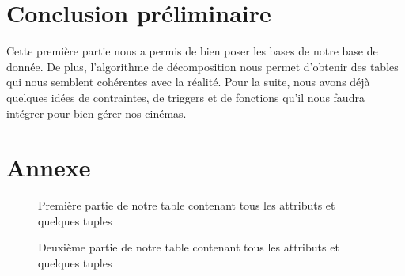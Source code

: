 \documentclass[a4paper,sffamily,12pt]{article}
\begin{document}
		\newpage

		\section{Conclusion préliminaire}

			\vspace{0.5cm}
			
			Cette première partie nous a permis de bien poser les bases de notre base de donnée. De plus, l'algorithme de décomposition nous permet d'obtenir des tables qui nous semblent cohérentes avec la réalité. Pour la suite, nous avons déjà quelques idées de contraintes, de triggers et de fonctions qu'il nous faudra intégrer pour bien gérer nos cinémas. \\			

			\newpage

			\section{Annexe}
							
				\begin{figure}[!h]		
					\centering
					\caption{Première partie de notre table contenant tous les attributs et quelques tuples}
					\label{table_p1}	
				\end{figure}			

				\begin{figure}[!h]
					\centering						
					\caption{Deuxième partie de notre table contenant tous les attributs et quelques tuples}
					\label{table_p2}	
				\end{figure}			
\end{document}
